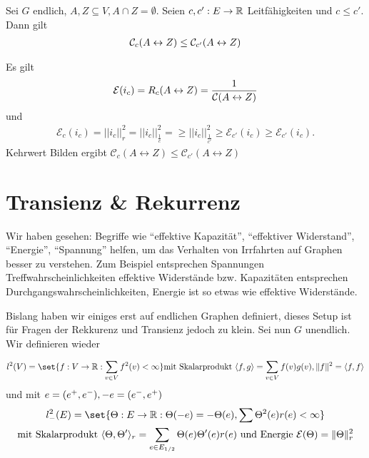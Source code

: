 \begin{satz}
	\label{satz:Rayleigh}
	Sei $G$ endlich, $A,Z \subseteq V, A \cap Z = \emptyset$. Seien $c,c' : E \to \mathbb{R}$ Leitfähigkeiten und $c \leq c'$. Dann gilt
	\begin{align}
	\mathcal{C}_c\enb{A \leftrightarrow Z} \leq \mathcal{C}_{c'} \enb{A \leftrightarrow Z}
	\end{align}
\end{satz}
\begin{beweis}
	Es gilt
	\begin{gather}
	\mathcal{E}(i_c) =  R_c(A \leftrightarrow Z) = \frac{1}{\leit{A \leftrightarrow Z}}
	\end{gather}
	und 
	\begin{gather}
	\mathcal{E}_c(i_c) = ||i_c||^2_r = ||i_c||^2_{\frac{1}{c}} =\geq ||i_c||^2_{\frac{1}{c'}} \geq \mathcal{E}_{c'}(i_c) \geq \mathcal{E}_{c'}(i_{c}).
	\end{gather}
	Kehrwert Bilden ergibt $\mathcal{C}_c(A \leftrightarrow Z) \leq \mathcal{C}_{c'} (A \leftrightarrow Z)$
\end{beweis}

\section{Transienz \& Rekurrenz}
\label{chap:TransienzUndRekurrenz}

Wir haben gesehen: Begriffe wie \enquote{effektive Kapazität}, \enquote{effektiver Widerstand}, \enquote{Energie}, \enquote{Spannung} helfen, um das Verhalten von Irrfahrten auf Graphen besser zu verstehen. Zum Beispiel entsprechen Spannungen Treffwahrscheinlichkeiten effektive Widerstände bzw. Kapazitäten entsprechen Durchgangswahrscheinlichkeiten, Energie ist so etwas wie effektive Widerstände.

Bislang haben wir einiges erst auf endlichen Graphen definiert, dieses Setup ist für Fragen der Rekkurenz und Transienz jedoch zu klein. Sei nun $G$ unendlich. Wir definieren wieder

\begin{gather}
l^2(V) = \set{f:V \to \Real: \sum\limits_{v\in V} f^2(v)<\infty } \text{mit Skalarprodukt } \sprod{f,g} = \sum\limits_{v \in V} f(v)g(v),  \Norm{f}^2 = \sprod{f,f}
\end{gather}
und mit $e = \enb{e^+,e^-}, -e = \enb{e^-,e^+}$
\begin{gather}
l^2_-(E) = \set{\Theta:E \to \Real: \Theta(-e) = -\Theta(e), \sum \Theta^2(e)r(e) < \infty} \\
\text{mit Skalarprodukt } \sprod{\Theta, \Theta'}_r = \sum\limits_{e \in E_{1/2}} \Theta(e)\Theta'(e)r(e) \text{ und Energie } \mathcal{E}(\Theta) = \Norm{\Theta}^2_r
\end{gather}

